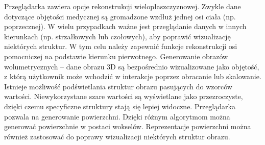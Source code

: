 Przeglądarka zawiera opcje rekonstrukcji wielopłaszczyznowej.
Zwykle dane dotyczące objętości medycznej są gromadzone wzdłuż jednej osi ciała (np. poprzecznej).
W wielu przypadkach ważne jest przeglądanie danych w innych kierunkach (np. strzałkowych lub czołowych), aby poprawić wizualizację niektórych struktur.
W tym celu należy zapewnić funkcje rekonstrukcji osi pomocniczej na podstawie kierunku pierwotnego.
Generowanie obrazów wolumetrycznych -- dane obrazu 3D są bezpośrednio wizualizowane jako objętość, z którą użytkownik może wchodzić w interakcje poprzez obracanie lub skalowanie.
Istnieje możliwość podświetlania struktur obrazu pasujących do wzorców wartości.
Niewykorzystane szare wartości są wyświetlane jako przezroczyste, dzięki czemu specyficzne struktury stają się lepiej widoczne.
Przeglądarka pozwala na generowanie powierzchni.
Dzięki różnym algorytmom można generować powierzchnie w postaci wokselów. Reprezentacje powierzchni można również zastosować do poprawy wizualizacji niektórych struktur obrazu.